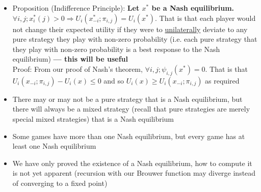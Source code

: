 \documentclass[20pt,a4paper,landscape]{extarticle}
\begin{document}
\begin{flushleft}
\begin{itemize}
\item Proposition (Indifference Principle): \textbf{Let \boldmath$x^\ast$ be a Nash equilibrium. $\forall i, j; x^\ast_i(j) > 0 \Rightarrow U_i(x^\ast_{-i}; \pi_{i, j}) = U_i(x^\ast)$}. That is that each player would not change their expected utility if they were to \underline{unilaterally} deviate to any pure strategy they play with non-zero probability (i.e. each pure strategy that they play with non-zero probability is a best response to the Nash equilibrium) \textbf{--- this will be useful}\\
Proof: From our proof of Nash's theorem, $\forall i, j; \psi_{i,j}(x^\ast) = 0$. That is that $U_i(x_{-i}; \pi_{i,j}) - U_i(x) \leq 0$ and so $U_i(x) \geq U_i(x_{-i}; \pi_{i,j})$ as required
\item There may or may not be a pure strategy that is a Nash equilibrium, but there will always be a mixed strategy (recall that pure strategies are merely special mixed strategies) that is a Nash equilibrium
\item Some games have more than one Nash equilibrium, but every game has at least one Nash equilibrium
\item We have only proved the existence of a Nash equilibrium, how to compute it is not yet apparent (recursion with our Brouwer function may diverge instead of converging to a fixed point)
\end{itemize}
\clearpage

\end{flushleft}
\end{document}
